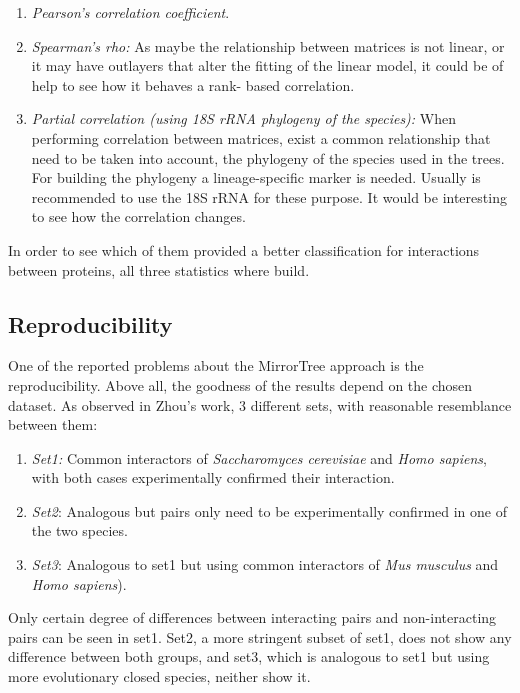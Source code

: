 \documentclass[11pt]{article}
\begin{document}
\begin{enumerate}
\setlength{\itemsep}{1pt}
	\item \textit{Pearson's correlation coefficient}\cite{Pazos2001}.
	\item \textit{Spearman's rho:} As maybe the relationship between matrices is not linear, or it may have 		outlayers that alter the fitting of the linear model, it could be of help to see how it behaves a rank-		based correlation.
	\item \textit{Partial correlation (using 18S rRNA phylogeny of the species):}\cite{Sato2005} When 			performing correlation between matrices, exist a common relationship that need to be taken into account, 		the phylogeny of the species used in the trees. For building the phylogeny a lineage-specific marker is 		needed. Usually is recommended to use the 18S rRNA for these purpose\cite{Sato2005}. It would be 				interesting to see how the correlation changes.
\end{enumerate}

In order to see which of them provided a better classification for interactions between proteins, all three statistics where build.

\subsection{Reproducibility}
One of the reported problems about the MirrorTree approach is the reproducibility. Above all, the goodness of the results depend on the chosen dataset. As observed in Zhou's work\cite{Zhou13}, 3 different sets, with reasonable resemblance between them:
\begin{enumerate}
\setlength{\itemsep}{1pt}
	\item \textit{Set1:} Common interactors of \textit{Saccharomyces cerevisiae} and \textit{Homo sapiens}, 		with both cases experimentally confirmed their interaction.
	\item \textit{Set2}: Analogous but pairs only need to be experimentally confirmed in one of the two 			species.
	\item \textit{Set3}: Analogous to set1 but using common interactors of \textit{Mus musculus} and   \textit{Homo sapiens}).
\end{enumerate}
Only certain degree of differences between interacting pairs and non-interacting pairs can be seen in set1. Set2, a more stringent subset of set1, does not show any difference between both groups, and set3, which is analogous to set1 but using more evolutionary closed species, neither show it.
\end{document}
